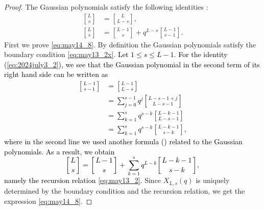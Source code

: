 \documentclass[sn-mathphys-num]{sn-jnl}%
\newcommand{\red}[1]{\textcolor{black}{#1}}
\theoremstyle{thmstyleone}%
\theoremstyle{thmstyletwo}%
\theoremstyle{thmstylethree}%
\begin{document}
\begin{proof}
The Gaussian polynomials satisfy the following identities \cite{A}:
\begin{align}
{ L \brack s }  &= { L \brack L-s }, \label{eq:2024july3_1} \\ 
{ L \brack s } &={ L-1 \brack s } + q^{L-s} { L-1 \brack s-1 }. \label{eq:2024july3_2}
\end{align}
First we prove \eqref{eq:may14_8}.
By definition the Gaussian polynomials satisfy the boundary condition \eqref{eq:may13_2x}.
\red{Let $1 \leq s \leq L-1$.
For the identity (\ref{eq:2024july3_2}), we see that the Gaussian polynomial in
the second term of its right hand side can
be written as
\begin{align*}
{ L-1 \brack s-1 }  &= { L-1 \brack L-s } \nonumber\\
&= \sum_{j=0}^{s-1} q^j { L-s-1+j \brack L-s-1 } \nonumber\\
&= \sum_{k=1}^{s} q^{s-k} { L-k-1 \brack L-s-1 } \nonumber\\
&= \sum_{k=1}^{s} q^{s-k} { L-k-1 \brack s-k },
%
\end{align*}
where in the second line we used another formula (\cite[Theorem 3.4, (3.3.9)]{A})
related to the Gaussian polynomials. 
}
%
\red{
As a result, we obtain 
\begin{equation*}
{ L \brack s } ={ L-1 \brack s } + \sum_{k=1}^{s} q^{L-k} { L-k-1 \brack s-k },
\end{equation*}
namely the recursion relation \eqref{eq:may13_2}.}
Since $X_{L,s}(q)$ is uniquely determined by
the boundary condition and the recursion relation, 
we get the expression \eqref{eq:may14_8}. 


\end{proof}
\end{document}
